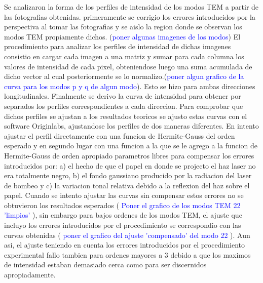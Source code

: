 \documentclass[10pt, a4paper]{article}%
\begin{document}
\begin{multicols}{2}
Se analizaron la forma de los perfiles de intensidad de los modos TEM a partir de las fotografias obtenidas. primeramente se corrigio los errores introducidos por la perspectiva al tomar las fotografias y se aislo la region donde se observan los modos TEM propiamente dichos. (\textcolor{Blue}{poner algunas imagenes de los modos}) El procedimiento para analizar los perfiles de intensidad de dichas imagenes consistio en cargar cada imagen a una matriz y sumar para cada columna los valores de intensidad de cada pixel, obteniendose luego una suma acumulada de dicho vector al cual posteriormente se lo normalizo.(\textcolor{Blue}{poner algun grafico de la curva para los modos p y q de algun modo}). Esto se hizo para ambas direcciones longitudinales. Finalmente se derivo la curva de intensidad para obtener por separados los perfiles correspondientes a cada direccion. Para comprobar que dichos perfiles se ajustan a los resultados teoricos se ajusto estas curvas con el software Originlabs, ajustandose los perfiles de dos maneras diferentes. En intento ajustar el perfil directamente con una funcion de Hermite-Gauss del orden esperado y en segundo lugar con una funcion a la que se le agrego a la funcion de Hermite-Gauss de orden apropiado parametros libres para compensar los errores introducidos por: a) el hecho de que el papel en donde se projecto el haz laser no era totalmente negro, b) el fondo gaussiano producido por la radiacion del laser de bombeo y c) la variacion tonal relativa debido a la reflexion del haz sobre el papel. Cuando se intento ajustar las curvas sin compensar estos errores no se obtuvieron los resultados esperados (\textcolor{Blue}{ Poner el grafico de los modos TEM 22 'limpios' }), sin embargo para bajos ordenes de los modos TEM, el ajuste que incluyo los errores introducidos por el procedimiento se correspondio con las curvas obtenidas (\textcolor{Blue}{ poner el grafico del ajuste 'compensado' del modo 22 }). Aun asi, el ajuste teniendo en cuenta los errores introducidos por el procedimiento experimental fallo tambien para ordenes mayores a 3 debido a que los maximos de intensidad estaban demasiado cerca como para ser discernidos apropiadamente.


\end{multicols}
\end{document}
